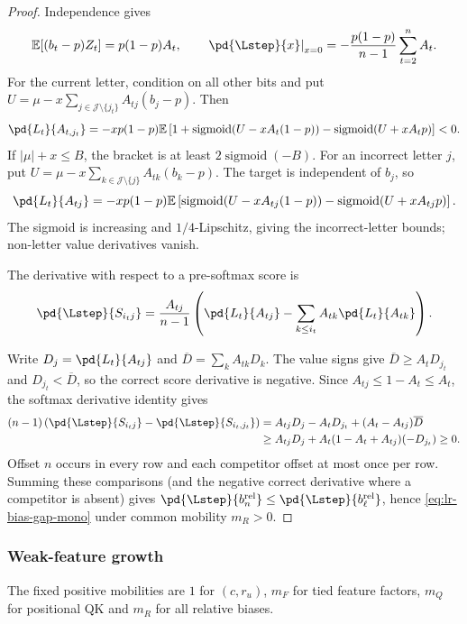 \begin{proof}
Independence gives
\[
 \mathbb E[(b_t-p)Z_t]=p(1-p)A_t,\qquad
 \left.\pd{\Lstep}{x}\right|_{x=0}
 =-\frac{p(1-p)}{n-1}\sum_{t=2}^n A_t.
\]
For the current letter, condition on all other bits and put
$U=\mu-x\sum_{j\in\mathcal J\setminus\{j_t\}}A_{tj}(b_j-p)$. Then
\[
 \pd{L_t}{A_{t,j_t}}=-xp(1-p)\mathbb E
 \left[1+\operatorname{sigmoid}(U-xA_t(1-p))-\operatorname{sigmoid}(U+xA_tp)\right]<0.
\]
If $|\mu|+x\le B$, the bracket is at least $2\operatorname{sigmoid}(-B)$.
For an incorrect letter $j$, put
$U=\mu-x\sum_{k\in\mathcal J\setminus\{j\}}A_{tk}(b_k-p)$.
The target is independent of $b_j$, so
\[
 \pd{L_t}{A_{tj}}=-xp(1-p)\mathbb E
 \left[\operatorname{sigmoid}(U-xA_{tj}(1-p))-\operatorname{sigmoid}(U+xA_{tj}p)\right].
\]
The sigmoid is increasing and $1/4$-Lipschitz, giving the incorrect-letter
bounds; non-letter value derivatives vanish.

The derivative with respect to a pre-softmax score is
\begin{equation}
 \pd{\Lstep}{S_{i_tj}}=\frac{A_{tj}}{n-1}
 \left(\pd{L_t}{A_{tj}}-\sum_{k\le i_t}A_{tk}\pd{L_t}{A_{tk}}\right).
\end{equation}

Write $D_j=\pd{L_t}{A_{tj}}$ and $\overline D=\sum_k A_{tk}D_k$.
The value signs give $\overline D\ge A_tD_{j_t}$ and $D_{j_t}<\overline D$,
so the correct score derivative is negative.
Since $A_{tj}\le1-A_t\le A_t$, the softmax derivative identity gives
\begin{align*}
 (n-1)\left(\pd{\Lstep}{S_{i_tj}}-\pd{\Lstep}{S_{i_t,j_t}}\right)
 &=A_{tj}D_j-A_tD_{j_t}+(A_t-A_{tj})\overline D\\
 &\ge A_{tj}D_j+A_t(1-A_t+A_{tj})(-D_{j_t})\ge0.
\end{align*}
Offset $n$ occurs in every row and each competitor offset at most once
per row. Summing these comparisons (and the negative correct derivative
where a competitor is absent) gives
$\pd{\Lstep}{b_n^{\mathrm{rel}}}\le\pd{\Lstep}{b_\ell^{\mathrm{rel}}}$,
hence \eqref{eq:lr-bias-gap-mono} under common mobility $m_R>0$.
\end{proof}

\subsubsection{Weak-feature growth}
\label{app:weak-routing-bootstrap}

The fixed positive mobilities are $1$ for $(c,r_u)$, $m_F$ for tied feature
factors, $m_Q$ for positional QK and $m_R$ for all relative biases.

